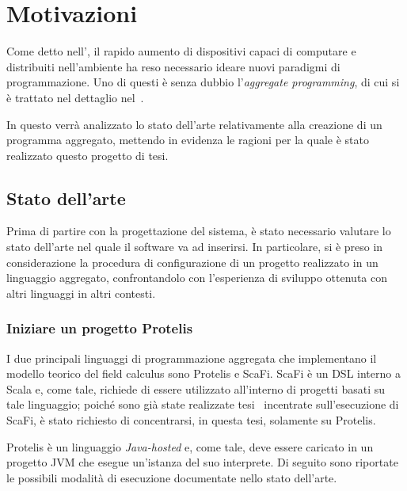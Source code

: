 \chapter{Motivazioni}\label{ch:motivations}

  Come detto nell', il rapido aumento di dispositivi capaci di computare e distribuiti nell'ambiente ha reso necessario ideare nuovi paradigmi di programmazione.
  Uno di questi è senza dubbio l'\emph{aggregate programming}, di cui si è trattato nel dettaglio nel~.

  In questo  verrà analizzato lo stato dell'arte relativamente alla creazione di un programma aggregato,
  mettendo in evidenza le ragioni per la quale è stato realizzato questo progetto di tesi.

  \section{Stato dell'arte}\label{sec:state-of-art}

  Prima di partire con la progettazione del sistema, è stato necessario valutare lo stato dell'arte nel quale il software va ad inserirsi.
  In particolare, si è preso in considerazione la procedura di configurazione di un progetto realizzato in un linguaggio aggregato,
  confrontandolo con l'esperienza di sviluppo ottenuta con altri linguaggi in altri contesti.

  \subsection{Iniziare un progetto Protelis}\label{subsec:setup}

  I due principali linguaggi di programmazione aggregata che implementano il modello teorico del field calculus sono Protelis e ScaFi.
  ScaFi è un DSL interno a Scala e, come tale, richiede di essere utilizzato all'interno di progetti basati su tale linguaggio;
  poiché sono già state realizzate tesi~\cite{amslaurea12188,amslaurea16824} incentrate sull'esecuzione di ScaFi,
  è stato richiesto di concentrarsi, in questa tesi, solamente su Protelis.

  Protelis è un linguaggio \emph{Java-hosted} e, come tale, deve essere caricato in un progetto JVM che esegue un'istanza del suo interprete.
  Di seguito sono riportate le possibili modalità di esecuzione documentate nello stato dell'arte.

